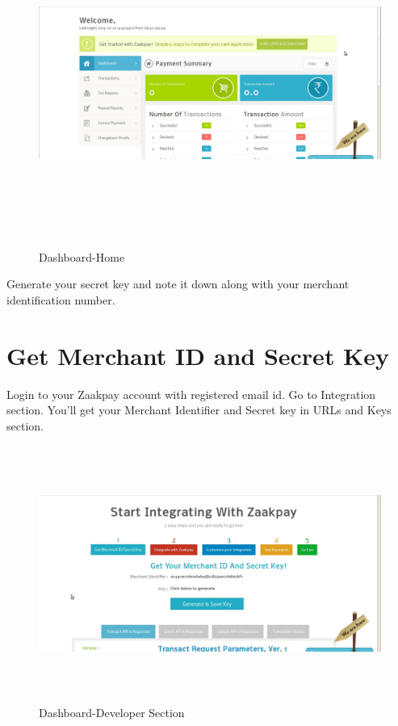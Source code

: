 \documentclass{article}
\begin{document}
 \begin{figure}[H]
\centering
\caption{Dashboard-Home}
\includegraphics[width=1.1\textwidth,height=4.2in]{Zaakpay_panel.png}
\end{figure}
Generate your secret key and note it down along with your merchant identification
number.

\newpage
\section{Get Merchant ID and Secret Key}
Login to your Zaakpay account with registered email id. Go to Integration section. You’ll get your Merchant Identifier and Secret key in URLs and Keys section. \\
\begin{figure}[H]
\centering
\caption{Dashboard-Developer Section}
\includegraphics[width=1\textwidth,height=3.3in]{Zaakpay_panel1.png}
\end{figure}
\end{document}

